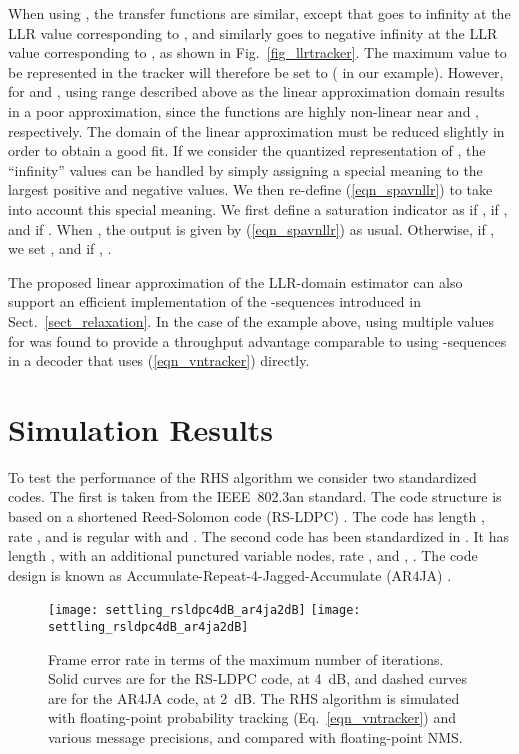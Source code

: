 \documentclass[12pt,journal,twoside,draftcls,onecolumn]{IEEEtran}
\begin{document}
	When using , the transfer functions are similar, except that  goes to infinity at the LLR value corresponding to , and similarly  goes to negative infinity at the LLR value corresponding to , as shown in Fig.~\ref{fig_llrtracker}. The maximum value to be represented in the tracker will therefore be set to  ( in our example). However, for  and , using range  described above as the linear approximation domain results in a poor approximation, since the functions are highly non-linear near  and , respectively. The domain of the linear approximation must be reduced slightly in order to obtain a good fit.
	If we consider the quantized representation of , the ``infinity'' values can be handled by simply assigning a special meaning to the largest positive and negative values. We then re-define (\ref{eqn_spavnllr}) to take into account this special meaning. We first define
	a saturation indicator  as  if ,  if , and  if .
	When , the output  is given by (\ref{eqn_spavnllr}) as usual. Otherwise, if , we set , and if , .
	
	The proposed linear approximation of the LLR-domain estimator can also support an efficient implementation of the -sequences introduced in Sect.~\ref{sect_relaxation}. In the case of the example above, using multiple values for  was found to provide a throughput advantage comparable to using -sequences in a decoder that uses (\ref{eqn_vntracker}) directly.



\section{Simulation Results}
\label{sect_results}

To test the performance of the RHS algorithm we consider two standardized codes. The first is taken from the IEEE~802.3an standard. The code structure is based on a shortened Reed-Solomon code (RS-LDPC) \cite{djurdjevic:2003}. The code has length , rate , and is regular with  and . The second code has been standardized 
in \cite{ccsds:2007}. 
It has length , with an additional  punctured variable nodes, rate , and , .
The code design is known as Accumulate-Repeat-4-Jagged-Accumulate (AR4JA) \cite{divsalar:2005}.

\begin{figure}[tbp]
\begin{center}
\ifCLASSOPTIONdraftcls
	\texttt{[image: settling\_rsldpc4dB\_ar4ja2dB]}
\else
	\texttt{[image: settling\_rsldpc4dB\_ar4ja2dB]}
\fi
\caption{Frame error rate in terms of the maximum number of iterations. Solid curves are for the RS-LDPC code, at 4~dB, and dashed curves are for the AR4JA code, at 2~dB. The RHS algorithm is simulated with floating-point probability tracking (Eq.~\ref{eqn_vntracker}) and various message precisions, and compared with floating-point NMS.}
\label{fig_settlingAll}
\end{center}
\end{figure}
\end{document}
